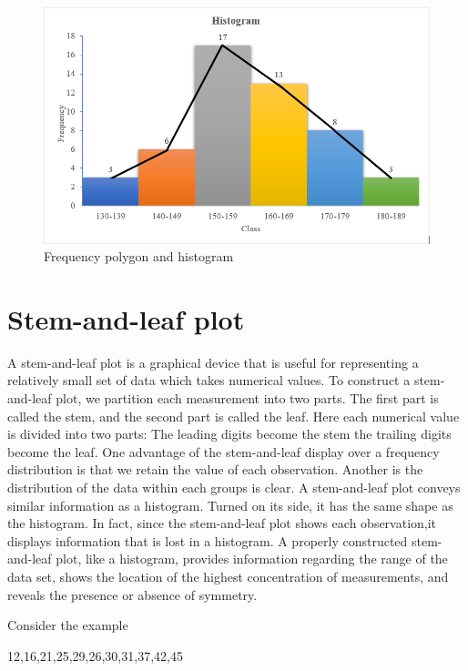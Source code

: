 \documentclass[
]{book}
\begin{document}
\begin{figure}

{\centering \includegraphics[width=0.9\linewidth]{images/histpoly} 

}

\caption{Frequency polygon and histogram}\label{fig:histpoly}
\end{figure}

\section{Stem-and-leaf plot}\label{stem-and-leaf-plot}

A stem-and-leaf plot is a graphical device that is useful for
representing a relatively small set of data which takes numerical
values. To construct a stem-and-leaf plot, we partition each measurement
into two parts. The first part is called the stem, and the second part
is called the leaf. Here each numerical value is divided into two parts:
The leading digits become the stem the trailing digits become the leaf.
One advantage of the stem-and-leaf display over a frequency distribution
is that we retain the value of each observation. Another is the
distribution of the data within each groups is clear. A stem-and-leaf
plot conveys similar information as a histogram. Turned on its side, it
has the same shape as the histogram. In fact, since the stem-and-leaf
plot shows each observation,it displays information that is lost in a
histogram. A properly constructed stem-and-leaf plot, like a histogram,
provides information regarding the range of the data set, shows the
location of the highest concentration of measurements, and reveals the
presence or absence of symmetry.

Consider the example

12,16,21,25,29,26,30,31,37,42,45
\end{document}
